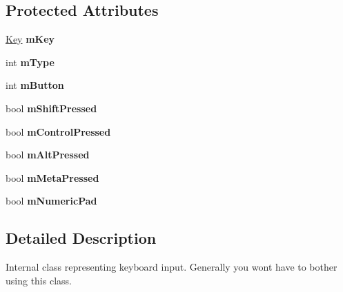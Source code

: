 \subsection*{Protected Attributes}
\begin{DoxyCompactItemize}
\item 
\hyperlink{classgcn_1_1Key}{Key} {\bfseries m\+Key}\hypertarget{classgcn_1_1KeyInput_af579abf84cd7919e596812d4dc02a9bc}{}\label{classgcn_1_1KeyInput_af579abf84cd7919e596812d4dc02a9bc}

\item 
int {\bfseries m\+Type}\hypertarget{classgcn_1_1KeyInput_aa67065f8018e9c7af3790fbe76075290}{}\label{classgcn_1_1KeyInput_aa67065f8018e9c7af3790fbe76075290}

\item 
int {\bfseries m\+Button}\hypertarget{classgcn_1_1KeyInput_a05ae4969d12ae30a5e8cbfefd5e00dd1}{}\label{classgcn_1_1KeyInput_a05ae4969d12ae30a5e8cbfefd5e00dd1}

\item 
bool {\bfseries m\+Shift\+Pressed}\hypertarget{classgcn_1_1KeyInput_afbb090fae43e9282ef979bd7c5592569}{}\label{classgcn_1_1KeyInput_afbb090fae43e9282ef979bd7c5592569}

\item 
bool {\bfseries m\+Control\+Pressed}\hypertarget{classgcn_1_1KeyInput_aa7ecdf141fdb6f94c08532b6023ca4c2}{}\label{classgcn_1_1KeyInput_aa7ecdf141fdb6f94c08532b6023ca4c2}

\item 
bool {\bfseries m\+Alt\+Pressed}\hypertarget{classgcn_1_1KeyInput_a7342e2085e95617709f00d23bad740d8}{}\label{classgcn_1_1KeyInput_a7342e2085e95617709f00d23bad740d8}

\item 
bool {\bfseries m\+Meta\+Pressed}\hypertarget{classgcn_1_1KeyInput_a5f4581f20bb0a6da36e967dbbe9e443b}{}\label{classgcn_1_1KeyInput_a5f4581f20bb0a6da36e967dbbe9e443b}

\item 
bool {\bfseries m\+Numeric\+Pad}\hypertarget{classgcn_1_1KeyInput_a2d2bdbbf601988bed312f152b14f1eb5}{}\label{classgcn_1_1KeyInput_a2d2bdbbf601988bed312f152b14f1eb5}

\end{DoxyCompactItemize}


\subsection{Detailed Description}
Internal class representing keyboard input. Generally you won\textquotesingle{}t have to bother using this class. 

